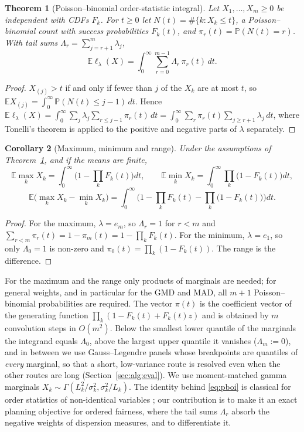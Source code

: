 \documentclass[11pt]{article}
\newtheorem{theorem}{Theorem}
\newtheorem{corollary}[theorem]{Corollary}
\theoremstyle{definition}
\newcommand{\E}{\mathbb{E}}
\newcommand{\Prob}{\mathbb{P}}
\newcommand{\lord}{\ell_\lambda}
\begin{document}
\begin{theorem}[Poisson--binomial order-statistic integral]\label{thm:pboi}
Let $X_1,\dots,X_m\ge 0$ be independent with CDFs $F_k$. For $t\ge0$ let
$N(t)=\#\{k:X_k\le t\}$, a Poisson--binomial count with success probabilities
$F_k(t)$, and $\pi_r(t)=\Prob(N(t)=r)$. With tail sums
$\Lambda_r=\sum_{j=r+1}^m\lambda_j$,
\begin{equation}\label{eq:pboi}
\E\lord(X)=\int_0^\infty\sum_{r=0}^{m-1}\Lambda_r\,\pi_r(t)\,dt .
\end{equation}
\end{theorem}
\begin{proof}
$X_{(j)}>t$ if and only if fewer than $j$ of the $X_k$ are at most $t$, so
$\E X_{(j)}=\int_0^\infty\Prob(N(t)\le j-1)\,dt$. Hence
$\E\lord(X)=\int_0^\infty\sum_j\lambda_j\sum_{r\le j-1}\pi_r(t)\,dt
=\int_0^\infty\sum_r\pi_r(t)\sum_{j\ge r+1}\lambda_j\,dt$, where Tonelli's theorem
is applied to the positive and negative parts of $\lambda$ separately.
\end{proof}

\begin{corollary}[Maximum, minimum and range]\label{cor:special}
Under the assumptions of Theorem~\ref{thm:pboi}, and if the means are finite,
\[
\E\max_kX_k=\int_0^\infty\Big(1-\prod_kF_k(t)\Big)dt,\qquad
\E\min_kX_k=\int_0^\infty\prod_k\big(1-F_k(t)\big)dt,
\]
\[
\E\big(\max_kX_k-\min_kX_k\big)=\int_0^\infty\Big(1-\prod_kF_k(t)-\prod_k\big(1-F_k(t)\big)\Big)dt .
\]
\end{corollary}
\begin{proof}
For the maximum, $\lambda=e_m$, so $\Lambda_r=1$ for $r<m$ and
$\sum_{r<m}\pi_r(t)=1-\pi_m(t)=1-\prod_kF_k(t)$. For the minimum, $\lambda=e_1$,
so only $\Lambda_0=1$ is non-zero and $\pi_0(t)=\prod_k(1-F_k(t))$. The range
is the difference.
\end{proof}

For the maximum and the range only products of marginals are needed; for
general weights, and in particular for the GMD and MAD, all $m+1$
Poisson--binomial probabilities are required. The vector $\pi(t)$ is the
coefficient vector of the generating function $\prod_k(1-F_k(t)+F_k(t)z)$
and is obtained by $m$ convolution steps in $O(m^2)$. Below the smallest
lower quantile of the marginals the integrand equals $\Lambda_0$, above the
largest upper quantile it vanishes ($\Lambda_m:=0$), and in between we use
Gauss--Legendre panels whose breakpoints are quantiles of \emph{every}
marginal, so that a short, low-variance route is resolved even when the other
routes are long (Section~\ref{sec:alg:eval}). We use moment-matched gamma
marginals $X_k\sim\Gamma(L_k^2/\sigma_k^2,\sigma_k^2/L_k)$. The identity behind
\eqref{eq:pboi} is classical for order statistics of non-identical variables
\citep{bapat1989order,balakrishnan2007permanents}; our contribution is to make
it an exact planning objective for ordered fairness, where the tail sums
$\Lambda_r$ absorb the negative weights of dispersion measures, and to
differentiate it.
\end{document}
